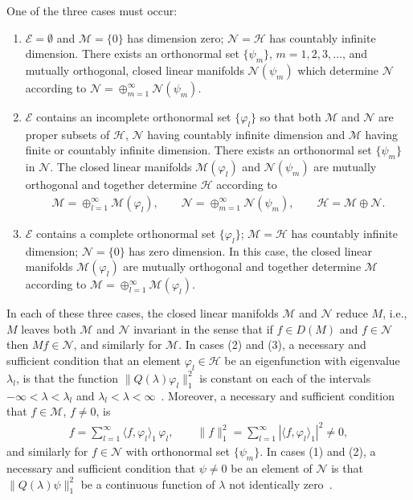 \documentclass[leqno,onefignum,onetabnum]{siamltex1213}
\newcommand{\Ec}{\mathcal{E}}
\newcommand{\Mc}{\mathcal{M}}
\newcommand{\Nc}{\mathcal{N}}
\newcommand{\Hs}{\mathscr{H}}
\begin{document}
\begin{theorem}
\label{thm:Hilbert_Eig_Decomp}  
One of the three cases must occur:
%
\begin{enumerate}
\item $\Ec=\emptyset$ and $\Mc=\{0\}$ has dimension zero; $\Nc=\Hs$
has countably infinite dimension. There exists an
orthonormal set $\{\psi_m\}$, $m=1,2,3,\ldots$, and mutually orthogonal, closed
linear manifolds $\Nc(\psi_m)$ which determine $\Nc$ according to
$\Nc=\oplus_{m=1}^\infty\Nc(\psi_m)$.    
\item $\Ec$ contains an incomplete orthonormal set $\{\varphi_l\}$ so that
both $\Mc$ and $\Nc$ are proper subsets of $\Hs$, $\Nc$ having
countably infinite dimension and $\Mc$ having finite or countably
infinite dimension. There exists an orthonormal set
$\{\psi_m\}$ in $\Nc$. The closed linear manifolds $\Mc(\varphi_l)$ and
$\Nc(\psi_m)$ are mutually orthogonal and together determine $\Hs$
according to   
%
\begin{align*}
  \Mc=\oplus_{l=1}^\infty\Mc(\varphi_l), \qquad
  \Nc=\oplus_{m=1}^\infty\Nc(\psi_m), \qquad
  \Hs=\Mc\oplus\Nc.
\end{align*}
%
\item $\Ec$ contains a complete orthonormal set $\{\varphi_l\}$; $\Mc=\Hs$
has countably infinite dimension; $\Nc=\{0\}$ has zero dimension. In
this case, the closed linear manifolds $\Mc(\varphi_l)$ are mutually
orthogonal and together determine $\Mc$ according 
to $\Mc=\oplus_{l=1}^\infty\Mc(\varphi_l)$.     
\end{enumerate}
%

In each of these three cases, the closed linear manifolds $\Mc$ and
$\Nc$ reduce $M$, i.e., $M$ leaves both $\Mc$ and $\Nc$ invariant in
the sense that if $f\in D(M)$ and $f\in\Nc$ then $M f\in\Nc$, and similarly
for $\Mc$. In cases (2) and (3), a necessary and sufficient condition
that an 
element $\varphi_l\in\Hs$ be an eigenfunction with eigenvalue $\lambda_l$, is that
the function $\|Q(\lambda)\varphi_l\|_1^2$ is constant on each of the intervals
$-\infty<\lambda<\lambda_l$ and $\lambda_l<\lambda<\infty$~\cite{Stone:64}. Moreover, a necessary and
sufficient condition that $f\in\Mc$, $f\neq0$, is 
%
\begin{align}\label{eq:Eig_Fun_Exp_f}
  f=\sum_{l=1}^\infty\langle f,\varphi_l\rangle_1\,\varphi_l,
  \qquad
  \|f\|_1^2=\sum_{l=1}^\infty|\langle f,\varphi_l\rangle_1|^2\neq0,
\end{align}
%
and similarly for $f\in\Nc$ with orthonormal set $\{\psi_m\}$.
In cases (1) and (2), a necessary and sufficient condition that $\psi\neq0$
be an element of $\Nc$ is that $\|Q(\lambda)\psi\|_1^2$ be a continuous function
of $\lambda$ not identically zero~\cite{Stone:64}. 



\end{theorem}
\end{document}
